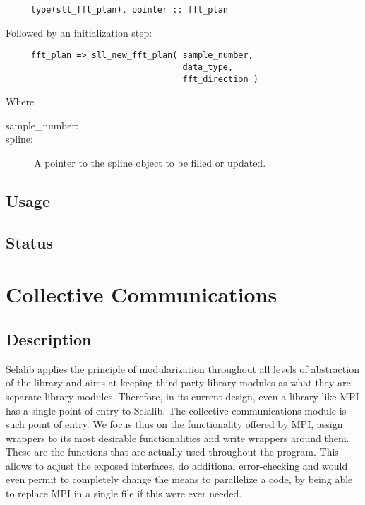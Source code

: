 \documentclass[]{report}   %
\begin{document}
\begin{verbatim}
     type(sll_fft_plan), pointer :: fft_plan
\end{verbatim}
Followed by an initialization step:
\begin{verbatim}
     fft_plan => sll_new_fft_plan( sample_number,  
                                   data_type, 
                                   fft_direction )
\end{verbatim}
Where 
\begin{description}
\item[sample\_number:] 
\item[spline:]
A pointer to the spline object to be filled or updated.
\end{description}

\subsection{Usage}
\subsection{Status}



\section{Collective Communications}
\subsection{Description}
Selalib applies the principle of modularization throughout all levels of abstraction of the library and aims at keeping third-party library modules as what they are: separate library modules. Therefore, in its current design, even a library like MPI has a single point of entry to Selalib. The collective communications module is such point of entry. We focus thus on the functionality offered by MPI, assign wrappers to its most desirable functionalities and write wrappers around them. These are the functions that are actually used throughout the program.  This allows to adjust the exposed interfaces, do additional error-checking and would even permit to completely change the means to parallelize a code, by being able to replace MPI in a single file if this were ever needed.
\end{document}
